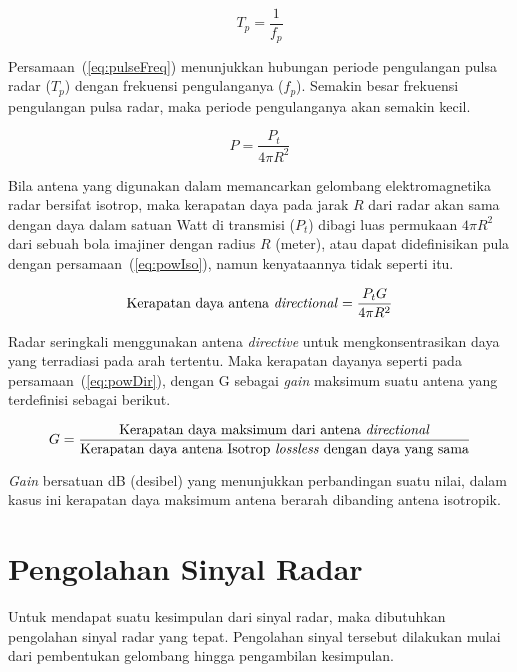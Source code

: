 \begin{equation}
	T_{p} = \frac{1}{f_{p}}
	\label{eq:pulseFreq}
\end{equation}

Persamaan~(\ref{eq:pulseFreq}) menunjukkan hubungan periode pengulangan pulsa radar ($T_{p}$) dengan frekuensi pengulanganya ($f_{p}$). Semakin besar frekuensi pengulangan pulsa radar, maka periode pengulanganya akan semakin kecil.

\begin{equation}
	P = \frac{P_{t}}{4\pi R^{2}}
	\label{eq:powIso}
\end{equation}

Bila antena yang digunakan dalam memancarkan gelombang elektromagnetika radar bersifat isotrop, maka kerapatan daya pada jarak $R$ dari radar akan sama dengan daya dalam satuan Watt di transmisi ($P_{t}$) dibagi luas permukaan $4\pi R^{2}$ dari sebuah bola imajiner dengan radius $R$ (meter), atau dapat didefinisikan pula dengan persamaan~(\ref{eq:powIso}), namun kenyataannya tidak seperti itu.

\begin{equation}
	\text{Kerapatan daya antena \textit{directional}} = \frac{P_{t} G}{4\pi R^{2}}
	\label{eq:powDir}
\end{equation}

Radar seringkali menggunakan antena \textit{directive} untuk mengkonsentrasikan daya yang terradiasi pada arah tertentu. Maka kerapatan dayanya seperti pada persamaan~(\ref{eq:powDir}), dengan G sebagai \textit{gain} maksimum suatu antena yang terdefinisi sebagai berikut.

\begin{equation}
	G  = \frac{\text{Kerapatan daya maksimum dari antena \textit{directional}}}{\text{Kerapatan daya antena Isotrop \textit{lossless} dengan daya yang sama}}
\end{equation}

\textit{Gain} bersatuan dB (desibel) yang menunjukkan perbandingan suatu nilai, dalam kasus ini kerapatan daya maksimum antena berarah dibanding antena isotropik.

\section{Pengolahan Sinyal Radar}
Untuk mendapat suatu kesimpulan dari sinyal radar, maka dibutuhkan pengolahan sinyal radar yang tepat. Pengolahan sinyal tersebut dilakukan mulai dari pembentukan gelombang hingga pengambilan kesimpulan. 

